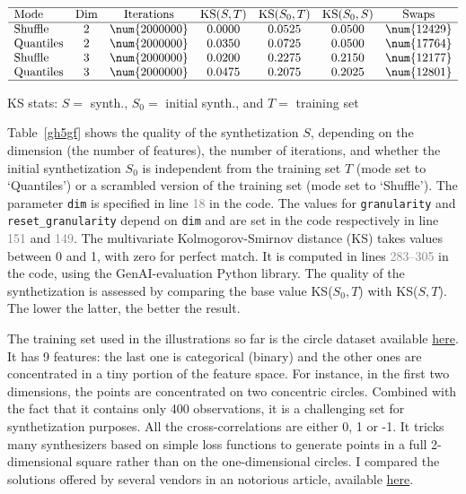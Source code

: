 \documentclass[oneside,10pt]{book}
\begin{document}
\begin{table}[H]
\small
\[
\begin{array}{lcccccc}
\hline
\text{Mode}	&	\text{Dim}	& \text{Iterations}	& \text{KS($S,T$)}	&	\text{KS($S_0, T$)}	&  \text{KS($S_0, S$)} & \text{Swaps}	\\
\hline
\text{Shuffle} &  2  & \num{2000000} & 0.0000 & 0.0525 & 0.0500 & \num{12429}\\
\text{Quantiles} &  2  & \num{2000000} & 0.0350 & 0.0725 & 0.0500 & \num{17764}\\
\text{Shuffle} &  3  & \num{2000000} & 0.0200 & 0.2275 & 0.2150 & \num{12177}\\
\text{Quantiles} &  3  & \num{2000000} & 0.0475 & 0.2075 & 0.2025 & \num{12801}\\
\hline
\end{array}
\]
\caption{\label{gh5gf}KS stats: $S =$  synth., $S_0 =$ initial synth., and $T =$ training set}
\end{table}



Table~\ref{gh5gf} shows the quality of the synthetization $S$, depending on the dimension (the number of features), the number of iterations,
 and whether the initial synthetization $S_0$ is independent from the training set $T$ (mode set to `Quantiles') or a scrambled version of the training set 
(mode set to `Shuffle'). 
The parameter \texttt{dim} is specified in line \textcolor{gray}{18} in the code. The values for \texttt{granularity} and \texttt{reset\_granularity}
 depend on \texttt{dim} and are set in the code respectively in line \textcolor{gray}{151}  and \textcolor{gray}{149}. 
The multivariate \textcolor{index}{Kolmogorov-Smirnov distance} (KS) takes values
 between 0 and 1, with zero for perfect match. It is computed in lines \textcolor{gray}{283--305} in the code, using the 
\textcolor{index}{GenAI-evaluation} Python library. The quality of the synthetization is assessed
by comparing the base value KS($S_0,T$) with KS($S, T$). The lower the latter, the better the result.

The training set used in the illustrations so far is the circle dataset available \href{https://github.com/VincentGranville/Main/blob/main/circle8d.csv}{here}. It has 9 features: the last one is categorical (binary) and the other ones
 are concentrated in a tiny portion of the feature space. For instance, in the first two dimensions, the points are concentrated on two concentric circles. 
Combined with the fact that it contains only 400 observations, it is a challenging set for synthetization purposes. All the cross-correlations are either 0, 1 or -1. 
It tricks many synthesizers based on simple loss functions to generate points in a full 2-dimensional square rather than on the one-dimensional circles.   
I compared the solutions offered by several vendors in an notorious article, available \href{https://mltblog.com/3qN7TPw}{here}.  
\end{document}
